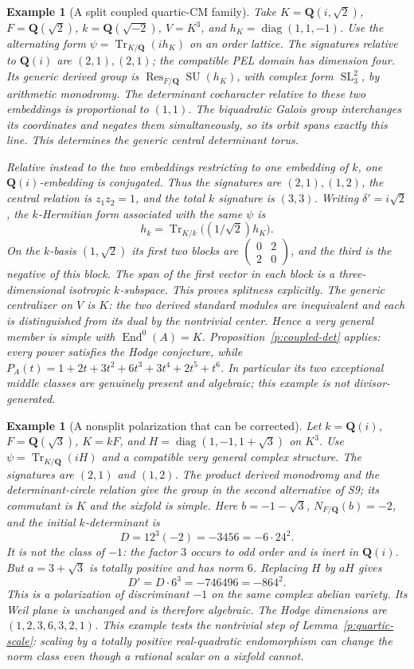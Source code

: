 \documentclass[10pt,reqno]{article}
\theoremstyle{emphasizedplain}
\theoremstyle{emphasizeddefinition}
\newtheorem{example}[theorem]{Example}
\theoremstyle{emphasizeddefinition}
\DeclareMathOperator{\End}{End}
\DeclareMathOperator{\SL}{SL}
\DeclareMathOperator{\SU}{SU}
\DeclareMathOperator{\Res}{Res}
\DeclareMathOperator{\Tr}{Tr}
\newcommand{\Q}{\mathbf Q}
\begin{document}
\begin{example}[A split coupled quartic-CM family]
Take $K=\Q(i,\sqrt2)$, $F=\Q(\sqrt2)$, $k=\Q(\sqrt{-2})$,
$V=K^3$, and $h_K=\operatorname{diag}(1,1,-1)$. Use the alternating form
$\psi=\Tr_{K/\Q}(i h_K)$ on an order lattice. The signatures relative
to $\Q(i)$ are $(2,1),(2,1)$; the compatible PEL domain has dimension
four. Its generic derived group is $\Res_{F/\Q}\SU(h_K)$, with complex
form $\SL_3^2$, by arithmetic monodromy. The determinant cocharacter
relative to these two embeddings is proportional to $(1,1)$. The
biquadratic Galois group interchanges its coordinates and negates them
simultaneously, so its orbit spans exactly this line. This determines the
generic central determinant torus.

Relative instead to the two embeddings restricting to one embedding of
$k$, one $\Q(i)$-embedding is conjugated. Thus the signatures are
$(2,1),(1,2)$, the central relation is $z_1z_2=1$, and the total $k$
signature is $(3,3)$. Writing $\delta'=i\sqrt2$, the $k$-Hermitian form
associated with the same $\psi$ is
\[
 h_k=\Tr_{K/k}\bigl((1/\sqrt2)h_K\bigr).
\]
On the $k$-basis $(1,\sqrt2)$ its first two blocks are
$\left(\begin{smallmatrix}0&2\\2&0\end{smallmatrix}\right)$, and the
third is the negative of this block. The span of the first vector in each
block is a three-dimensional isotropic $k$-subspace. This proves splitness
explicitly. The generic centralizer on $V$ is $K$: the two derived
standard modules are inequivalent and each is distinguished from its dual
by the nontrivial center. Hence a very general member is simple with
$\End^0(A)=K$. Proposition~\ref{p:coupled-det} applies: every power
satisfies the Hodge conjecture, while
$P_A(t)=1+2t+3t^2+6t^3+3t^4+2t^5+t^6$.
In particular its two exceptional middle classes are genuinely present
and algebraic; this example is not divisor-generated.
\end{example}

\begin{example}[A nonsplit polarization that can be corrected]
Let $k=\Q(i)$, $F=\Q(\sqrt3)$, $K=kF$, and
$H=\operatorname{diag}(1,-1,1+\sqrt3)$ on $K^3$.
Use $\psi=\Tr_{K/\Q}(iH)$ and a compatible very general complex structure.
The signatures are $(2,1)$ and $(1,2)$. The product derived monodromy
and the determinant-circle relation give the group in the second
alternative of S9; its commutant is $K$ and the sixfold is simple.
Here $b=-1-\sqrt3$, $N_{F/\Q}(b)=-2$, and the initial $k$-determinant is
\[
 D=12^3(-2)=-3456=-6\cdot24^2.
\]
It is not the class of $-1$: the factor $3$ occurs to odd order and
is inert in $\Q(i)$. But $a=3+\sqrt3$ is totally positive and has
norm $6$. Replacing $H$ by $aH$ gives
\[
 D'=D\cdot6^3=-746496=-864^2.
\]
This is a polarization of discriminant $-1$ on the same complex abelian
variety. Its Weil plane is unchanged and is therefore algebraic.
The Hodge dimensions are $(1,2,3,6,3,2,1)$.
This example tests the nontrivial step of Lemma~\ref{p:quartic-scale}:
scaling by a totally positive real-quadratic endomorphism can change
the norm class even though a rational scalar on a sixfold cannot.
\end{example}
\end{document}
